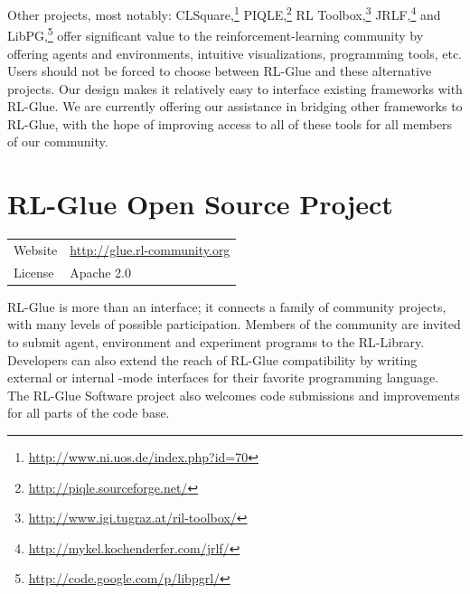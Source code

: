 \documentclass[twoside,11pt]{article}
\begin{document}
Other projects, most notably: CLSquare,\footnote{\url{http://www.ni.uos.de/index.php?id=70}}  PIQLE,\footnote{\url{http://piqle.sourceforge.net/}} RL Toolbox,\footnote{\url{http://www.igi.tugraz.at/ril-toolbox/}
} JRLF,\footnote{\url{http://mykel.kochenderfer.com/jrlf/}}  and LibPG,\footnote{\url{http://code.google.com/p/libpgrl/}} offer significant value to the reinforcement-learning community by offering agents and environments, intuitive visualizations, programming tools, etc.  Users should not be forced to choose between RL-Glue and these alternative projects. Our design makes it relatively easy to interface existing frameworks with RL-Glue.  We are currently offering our assistance in bridging other frameworks to RL-Glue, with the hope of improving access to all of these tools for all members of our community.





 
 
 
\section{RL-Glue Open Source Project}
\begin{tabular}{ l l }
  Website &  \url{http://glue.rl-community.org} \\
  License & Apache 2.0  \\
\end{tabular}
\newline
\newline
RL-Glue is more than an interface; it connects a family of community projects, with many levels of possible participation. Members of the community are invited to submit agent, environment and experiment programs to the RL-Library. Developers can also extend the reach of RL-Glue compatibility by writing external or internal -mode interfaces for their favorite programming language.  The RL-Glue Software project also welcomes code submissions and improvements for all parts of the code base.  

\end{document}
